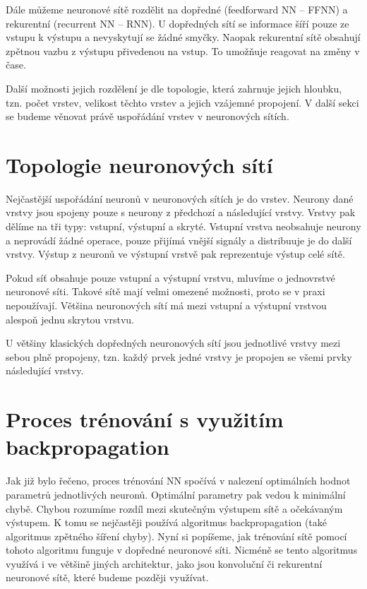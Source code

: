 Dále můžeme neuronové sítě rozdělit na dopředné (feedforward NN – FFNN) a
rekurentní (recurrent NN – RNN). U dopředných sítí se informace šíří pouze ze
vstupu k výstupu a nevyskytují se žádné smyčky. Naopak rekurentní sítě obsahují
zpětnou vazbu z výstupu přivedenou na vstup. To umožňuje reagovat na změny v
čase.

Další možnosti jejich rozdělení je dle topologie, která zahrnuje jejich
hloubku, tzn. počet vrstev, velikost těchto vrstev a jejich vzájemné propojení.
V další sekci se budeme věnovat právě uspořádání vrstev v neuronových sítích.

\section{Topologie neuronových sítí}
Nejčastější uspořádání neuronů v neuronových sítích je do vrstev. Neurony dané
vrstvy jsou spojeny pouze s neurony z předchozí a následující vrstvy. Vrstvy
pak dělíme na tři typy: vstupní, výstupní a skryté. Vstupní vrstva neobsahuje
neurony a neprovádí žádné operace, pouze přijímá vnější signály a distribuuje
je do další vrstvy. Výstup z neuronů ve výstupní vrstvě pak reprezentuje výstup
celé sítě.

Pokud síť obsahuje pouze vstupní a výstupní vrstvu, mluvíme o jednovrstvé
neuronové síti. Takové sítě mají velmi omezené možnosti, proto se v praxi
nepoužívají. Většina neuronových sítí má mezi vstupní a výstupní vrstvou
alespoň jednu skrytou vrstvu.%

U většiny klasických dopředných neuronových sítí jsou jednotlivé vrstvy mezi
sebou plně propojeny, tzn. každý prvek jedné vrstvy je propojen se všemi prvky
následující vrstvy.


\section{Proces trénování s využitím backpropagation}

Jak již bylo řečeno, proces trénování NN spočívá v nalezení optimálních hodnot
parametrů jednotlivých neuronů. Optimální parametry pak vedou k minimální
chybě. Chybou rozumíme rozdíl mezi skutečným výstupem sítě a očekávaným
výstupem. K tomu se nejčastěji používá algoritmus backpropagation (také
algoritmus zpětného šíření chyby). Nyní si popíšeme, jak trénování sítě pomocí
tohoto algoritmu funguje v dopředné neuronové síti. Nicméně se tento algoritmus
využívá i ve většině jiných architektur, jako jsou konvoluční či rekurentní
neuronové sítě, které budeme později využívat.

